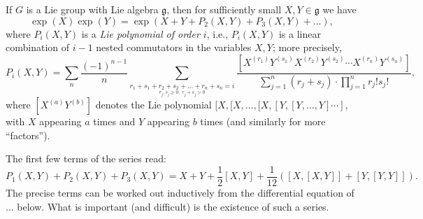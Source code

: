 \begin{theorem} 
\label{theorem-Baker-Campbell-Hausdorff}
If $G$ is a Lie group with Lie algebra $\mathfrak g$, then for sufficiently small $X, Y\in \mathfrak g$ we have 
\begin{equation}
 \label{equation-BCH}
\exp(X) \exp(Y) = \exp(X+ Y + P_2(X,Y) + P_3 (X,Y) + \dots),
\end{equation}
where $P_i(X,Y)$ is a \emph{Lie polynomial of order $i$}, i.e., $P_i(X, Y)$ is a linear combination of $i-1$ nested commutators in the variables $X, Y$; more precisely, 
\begin{equation}
\label{equation-BCHterms}
P_i(X,Y) = \sum_n \frac{(-1)^{n-1}}{n} \sum_{\underset{r_j, s_j \ge 0, \,\, r_j+s_j>0}{r_1+s_1+ r_2+s_2+ \dots+ r_n+s_n = i}} \frac{[X^{(r_1)} Y^{(s_1)} X^{(r_2)} Y^{(s_2)} \cdots X^{(r_n)} Y^{(s_n)}]}{\sum_{j=1}^n (r_j+s_j) \cdot \prod_{j=1}^n r_j! s_j!},
\end{equation}
where $[X^{(a)} Y^{(b)}]$ denotes the Lie polynomial $[X, [X, \dots, [X, [Y,[Y,\dots, Y]\cdots]$, with $X$ appearing $a$ times and $Y$ appearing $b$ times (and similarly for more ``factors'').
\end{theorem}

The first few terms of the series read:
$$P_1(X,Y)+P_2(X,Y)+P_3(X,Y) =  X+Y+ \frac{1}{2}[X,Y] + \frac{1}{12} ([X,[X,Y]]  + [Y, [Y,Y]]).$$ 
The precise terms can be worked out inductively from the differential equation of ...  below. What is important (and difficult) is the existence of such a series.

